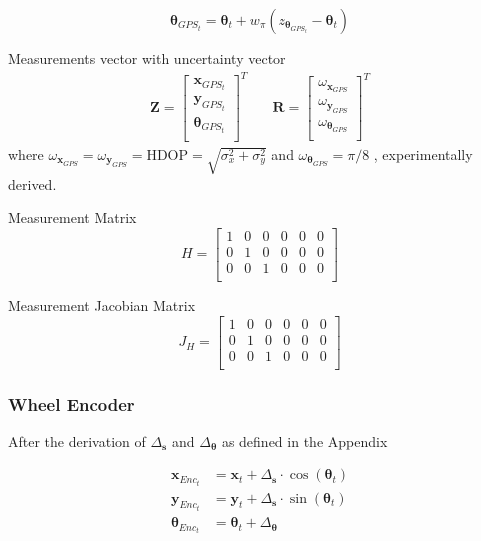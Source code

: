 $$
\boldsymbol \theta_{GPS_t} = \boldsymbol \theta_{t} + w_{\pi}(z_{\boldsymbol \theta_{GPS_t}} - \boldsymbol \theta_{t})
$$

Measurements vector with uncertainty vector
\begin{align}
\mathbf{Z}
=
\begin{bmatrix} 
\mathbf{x}_{GPS_t} \\ 
\mathbf{y}_{GPS_t} \\ 
\boldsymbol \theta_{GPS_t} \\ 
\end{bmatrix}^T
& \quad
\mathbf{R}
=
\begin{bmatrix} 
\omega_{\mathbf{x}_{GPS}} \\ 
\omega_{\mathbf{y}_{GPS}} \\ 
\omega_{\boldsymbol \theta_{GPS}} \\ 
\end{bmatrix}^T
\end{align}
where $ \omega_{\mathbf{x}_{GPS}} = \omega_{\mathbf{y}_{GPS}} = \text{HDOP} = \sqrt{\sigma_x^2 + \sigma_y^2}$ and 
$ \omega_{\boldsymbol \theta_{GPS}} = \pi/8 $ , experimentally derived.

Measurement Matrix
\begin{equation}
H
=
\begin{bmatrix} 
1 & 0 & 0 & 0 & 0 & 0 \\ 
0 & 1 & 0 & 0 & 0 & 0 \\ 
0 & 0 & 1 & 0 & 0 & 0 \\ 
\end{bmatrix}
\end{equation}

Measurement Jacobian Matrix
\begin{equation}
J_H
=
\begin{bmatrix} 
1 & 0 & 0 & 0 & 0 & 0 \\ 
0 & 1 & 0 & 0 & 0 & 0 \\ 
0 & 0 & 1 & 0 & 0 & 0 \\ 
\end{bmatrix}
\end{equation}

\subsubsection{Wheel Encoder}

After the derivation of $\Delta_{\textbf{s}}$ and $\Delta_{\boldsymbol \theta}$ as defined in the Appendix 

\begin{align}
\mathbf{x}_{Enc_t} & = \mathbf{x}_{t} + \Delta_{\textbf{s}} \cdot \cos(\boldsymbol \theta_{t}) \\
\mathbf{y}_{Enc_t} & = \mathbf{y}_{t} + \Delta_{\textbf{s}} \cdot \sin(\boldsymbol \theta_{t}) \\
\boldsymbol \theta_{Enc_t} & = \boldsymbol \theta_{t} + \Delta_{\boldsymbol \theta}
\end{align}


